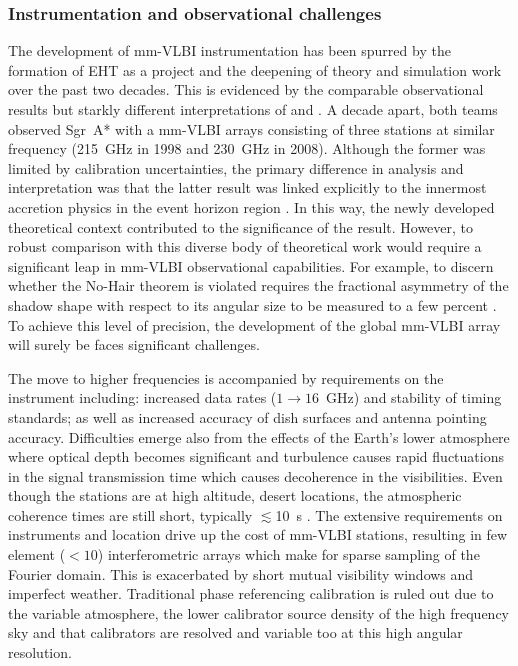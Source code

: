 \subsubsection{Instrumentation and observational challenges}\label{sec:eht_obs}


The development of mm-VLBI instrumentation has been spurred by the formation of EHT as a project and the deepening of theory and simulation work over the past two decades. This is evidenced by the comparable observational results but starkly different interpretations of \citet{Krichbaum_1998} and \citet{Doeleman_2008}. A decade apart, both teams observed Sgr~A* with a mm-VLBI arrays consisting of three stations at similar frequency (215~GHz in 1998 and 230~GHz in 2008). Although the former was limited by calibration uncertainties, the primary difference in analysis and interpretation was that the latter result was linked explicitly to the innermost accretion physics in the event horizon region \citep[e.g.][]{Broderick_2011}. In this way, the newly developed theoretical context contributed to the significance of the \citet{Doeleman_2008} result. However, to robust comparison with this diverse body of theoretical work would require a significant leap in mm-VLBI observational capabilities. For example, to discern whether the No-Hair theorem is violated requires the fractional asymmetry of the shadow shape with respect to its angular size to be measured to a few percent \citep[e.g.][and references therein]{Goddi_2016}. To achieve this level of precision, the development of the global mm-VLBI array will surely be faces significant challenges.


The move to higher frequencies is accompanied by requirements on the instrument including: increased data rates ($1 \to 16$~GHz) and stability of timing standards; as well as increased accuracy of dish surfaces and antenna pointing accuracy. Difficulties emerge also from the effects of the Earth's lower atmosphere where optical depth becomes significant and turbulence causes rapid fluctuations in the signal transmission time which causes decoherence in the visibilities. Even though the stations are at high altitude, desert locations, the atmospheric coherence times are still short, typically $\lesssim$10~s \citep{Doeleman_2009}. The extensive requirements on instruments and location drive up the cost of mm-VLBI stations, resulting in few element ($<10$) interferometric arrays which make for sparse sampling of the Fourier domain. This is exacerbated by short mutual visibility windows and imperfect weather. Traditional phase referencing calibration is ruled out due to the variable atmosphere, the lower calibrator source density of the high frequency sky and that calibrators are resolved and variable too at this high angular resolution. 


